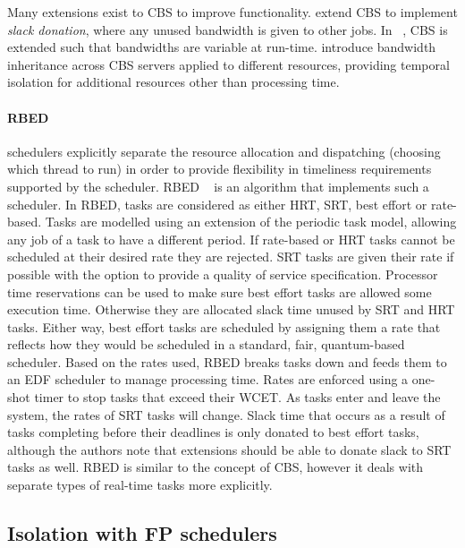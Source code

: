 Many extensions exist to \gls{CBS} to improve functionality.  \citet{Kato_IR_11} extend \gls{CBS} to
implement \emph{slack donation}, where any unused bandwidth is given to other jobs.  In
~\citep{Craciunas_KPRS_12}, \gls{CBS} is extended such that bandwidths are variable at run-time.
\citet{Lamastra_LA_01} introduce bandwidth inheritance across CBS servers applied to different
resources, providing temporal isolation for additional resources other than processing time.

\paragraph{\Gls{RBED}} schedulers explicitly separate the resource allocation and dispatching
(choosing which thread to run) in order to provide flexibility in timeliness requirements supported
by the scheduler.  \Gls{RBED} ~\citep{Brandt_BLB_03} is an algorithm that implements such a
scheduler.  In \gls{RBED}, tasks are considered as either \gls{HRT}, \gls{SRT}, best effort or
rate-based.  Tasks are modelled using an extension of the periodic task model, allowing any job of a
task to have a different period.  If rate-based or \gls{HRT} tasks cannot be scheduled at their
desired rate they are rejected.  \gls{SRT} tasks are given their rate if possible with the option to
provide a quality of service specification.  Processor time reservations can be used to make sure
best effort tasks are allowed some execution time.  Otherwise they are allocated slack time unused
by SRT and HRT tasks.  Either way, best effort tasks are scheduled by assigning them a rate that
reflects how they would be scheduled in a standard, fair, quantum-based scheduler.  Based on the
rates used, \gls{RBED} breaks tasks down and feeds them to an \gls{EDF} scheduler to manage
processing time.  Rates are enforced using a one-shot timer to stop tasks that exceed their
{\gls{WCET}}.  As tasks enter and leave the system, the rates of \gls{SRT} tasks will change.  Slack
time that occurs as a result of tasks completing before their deadlines is only donated to best
effort tasks, although the authors note that extensions should be able to donate slack to \gls{SRT}
tasks as well.  \Gls{RBED} is similar to the concept of CBS, however it deals with separate types of
real-time tasks more explicitly.

\subsection{Isolation with FP schedulers}
\label{background:fp-isolation}

